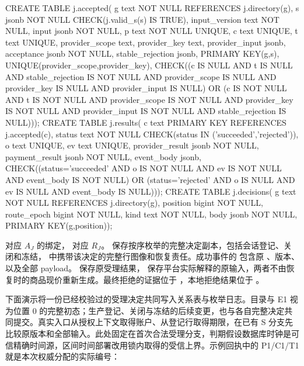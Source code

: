 \begin{BookCode}
CREATE TABLE j.accepted(
  g text NOT NULL REFERENCES j.directory(g),
  s jsonb NOT NULL CHECK(j.valid_s(s) IS TRUE),
  input_version text NOT NULL, input jsonb NOT NULL,
  p text NOT NULL UNIQUE, c text UNIQUE, t text UNIQUE,
  provider_scope text, provider_key text, provider_input jsonb,
  acceptance jsonb NOT NULL, stable_rejection jsonb,
  PRIMARY KEY(g,s), UNIQUE(provider_scope,provider_key),
  CHECK((c IS NULL AND t IS NULL AND stable_rejection IS NOT NULL
         AND provider_scope IS NULL AND provider_key IS NULL
         AND provider_input IS NULL)
     OR (c IS NOT NULL AND t IS NOT NULL
         AND provider_scope IS NOT NULL
         AND provider_key IS NOT NULL AND provider_input IS NOT NULL
         AND stable_rejection IS NULL)));
CREATE TABLE j.results(
  c text PRIMARY KEY REFERENCES j.accepted(c),
  status text NOT NULL CHECK(status IN ('succeeded','rejected')),
  o text UNIQUE, ev text UNIQUE,
  provider_result jsonb NOT NULL, payment_result jsonb NOT NULL,
  event_body jsonb,
  CHECK((status='succeeded' AND o IS NOT NULL AND ev IS NOT NULL
         AND event_body IS NOT NULL)
     OR (status='rejected' AND o IS NULL AND ev IS NULL
         AND event_body IS NULL)));
CREATE TABLE j.decisions(
  g text NOT NULL REFERENCES j.directory(g), position bigint NOT NULL,
  route_epoch bigint NOT NULL, kind text NOT NULL,
  body jsonb NOT NULL, PRIMARY KEY(g,position));
\end{BookCode}

 对应 $A_J$ 的绑定， 对应 $R_J$。 保存按序枚举的完整决定副本，包括会话登记、关闭和冻结， 中携带该决定的完整行图像和恢复责任。成功事件的  包含原 、版本、 以及全部 payload。 保存原受理结果， 保存平台实际解释的原输入，两者不由恢复时的商品现价重新生成。最终拒绝的证据位于 ，本地拒绝结果位于 。

下面演示将一份已经校验过的受理决定共同写入关系表与枚举日志。目录与 E1 视为位置 0 的完整初态；生产登记、关闭与冻结的后续变更，也与各自完整决定共同提交。真实入口从授权上下文取得账户、从登记行取得期限，在已有 S 分支先比较原版本和全部输入。此处固定在首次合法受理分支，判期假设数据库时钟是可信精确时间源，区间时间部署改用锁内取得的受信上界。示例回执中的 P1/C1/T1 就是本次权威分配的实际编号：

